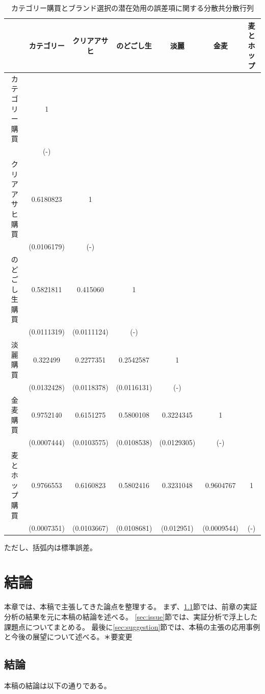 \documentclass[11pt]{jsarticle}
\begin{document}
\begin{table}[htbp]
 \centering
  \caption{カテゴリー購買とブランド選択の潜在効用の誤差項に関する分散共分散行列}
\begin{center}
 \begin{tabular}{c|cccccc} \hline
   & カテゴリー & クリアアサヒ & のどごし生 & 淡麗 & 金麦 & 麦とホップ \\ \hline
カテゴリー購買 & 1 &  &  &  &  &  \\
   & (-) &  &  &  &  &  \\
クリアアサヒ購買 & 0.6180823 & 1 &  &  &  &  \\
 & (0.0106179) & (-) &  &  &  &  \\
のどごし生購買 & 0.5821811 & 0.415060 & 1 &  &  &  \\
 & (0.0111319) & (0.0111124) & (-) &  &  &  \\
淡麗購買 & 0.322499 & 0.2277351 & 0.2542587 & 1 &  &  \\
 & (0.0132428) & (0.0118378) & (0.0116131) & (-) &  &  \\
金麦購買 & 0.9752140 & 0.6151275 & 0.5800108 & 0.3224345 & 1 &  \\
 & (0.0007444) & (0.0103575) & (0.0108538) & (0.0129305) & (-) &  \\
麦とホップ購買 & 0.9766553 & 0.6160823 & 0.5802416 & 0.3231048 & 0.9604767 & 1 \\
 & (0.0007351) & (0.0103667) & (0.0108681) & (0.012951) & (0.0009544) & (-) \\
 \end{tabular}
 \label{tab:simultaneous_matrix}
 \end{center}
\end{table}
ただし、括弧内は標準誤差。




\section{結論}
\label{ch:conclusion}
本章では、本稿で主張してきた論点を整理する。
まず、\ref{sec:conclusion}節では、前章の実証分析の結果を元に本稿の結論を述べる。
\ref{sec:issue}節では、実証分析で浮上した課題点についてまとめる。
最後に\ref{sec:suggestion}節では、本稿の主張の応用事例と今後の展望について述べる。＊要変更

\subsection{結論}
\label{sec:conclusion}
本稿の結論は以下の通りである。
\end{document}
